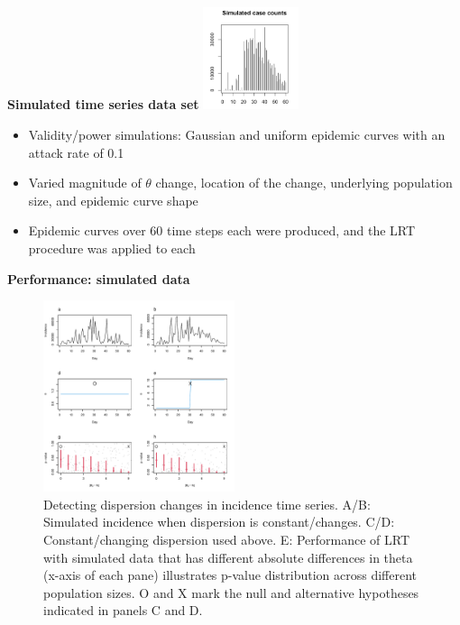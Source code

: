 \documentclass{beamer}
\begin{document}
\begin{frame}{\textbf{Simulated time series data set}}
\includegraphics[height=3cm]{sim}
    \begin{itemize}[<+->] %
	\item Validity/power simulations: Gaussian and uniform epidemic curves with an attack rate of 0.1 
 	\item Varied magnitude of \begin{math}\theta\end{math} change, location of the change, underlying population size, and epidemic curve shape
	\item Epidemic curves over 60 time steps each were produced, and the LRT procedure was applied to each
\end{itemize}
\end{frame}

\begin{frame}{\textbf{Performance: simulated data}}
		\begin{figure}[!h]
			\includegraphics[width=0.5\textwidth]{fig1}
			\caption{
				Detecting dispersion changes in incidence time series. A/B: Simulated incidence when dispersion is constant/changes. C/D: Constant/changing dispersion used above. E: Performance of LRT with simulated data that has different absolute differences in theta (x-axis of each pane) illustrates p-value distribution across different population sizes. O and X mark the null and alternative hypotheses indicated in panels C and D. 
			}
			\label{fig1}
		\end{figure}
\end{frame}
\end{document}
